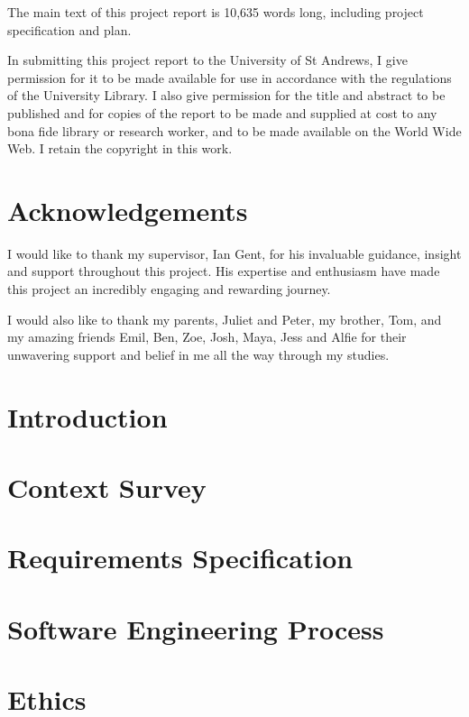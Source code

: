 \documentclass[12pt]{report}
\begin{document}
The main text of this project report is 10,635 words long, including project specification and plan.

In submitting this project report to the University of St Andrews, I give permission for it to be made available for use in accordance with the regulations of the University Library. I also give permission for the title and abstract to be published and for copies of the report to be made and supplied at cost to any bona fide library or research worker, and to be made available on the World Wide Web. I retain the copyright in this work.

\chapter*{Acknowledgements}
I would like to thank my supervisor, Ian Gent, for his invaluable guidance, insight and support throughout this project. His expertise and enthusiasm have made this project an incredibly engaging and rewarding journey.

I would also like to thank my parents, Juliet and Peter, my brother, Tom, and my amazing friends Emil, Ben, Zoe, Josh, Maya, Jess and Alfie for their unwavering support and belief in me all the way through my studies.

\tableofcontents

\chapter{Introduction}


\chapter{Context Survey}


\chapter{Requirements Specification}


\chapter{Software Engineering Process}


\chapter{Ethics}

\end{document}
